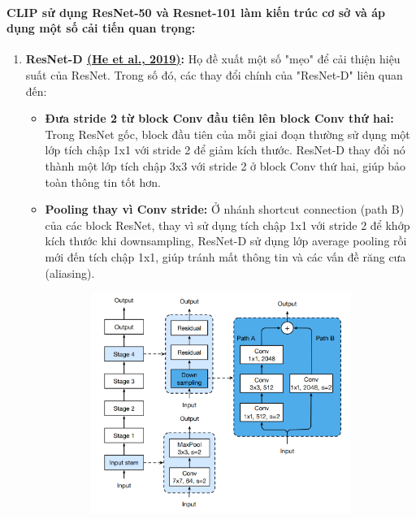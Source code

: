\paragraph{CLIP sử dụng ResNet-50 và Resnet-101 làm kiến trúc cơ sở và áp dụng một số cải tiến quan trọng:}
\begin{enumerate}
\item \textbf{ResNet-D \hyperref[resnet-d]{(He et al., 2019)}:} Họ đề xuất một số "mẹo" để cải thiện hiệu suất của ResNet. Trong số đó, các thay đổi chính của "ResNet-D" liên quan đến:
\begin{itemize}
    \item \textbf{Đưa stride 2 từ block Conv đầu tiên lên block Conv thứ hai:} Trong ResNet gốc, block đầu tiên của mỗi giai đoạn thường sử dụng một lớp tích chập 1x1 với stride 2 để giảm kích thước. ResNet-D thay đổi nó thành một lớp tích chập 3x3 với stride 2 ở block Conv thứ hai, giúp bảo toàn thông tin tốt hơn.
    \item \textbf{Pooling thay vì Conv stride:} Ở nhánh shortcut connection (path B) của các block ResNet, thay vì sử dụng tích chập 1x1 với stride 2 để khớp kích thước khi downsampling, ResNet-D sử dụng lớp average pooling rồi mới đến tích chập 1x1, giúp tránh mất thông tin và các vấn đề răng cưa (aliasing).
\end{itemize}
\begin{figure}[H]
    \centering
    \begin{subfigure}[b]{0.5\textwidth}
        \centering
        \includegraphics[width=\textwidth]{img/03-resnet_50.png}

\end{subfigure}
\end{figure}
\end{enumerate}
